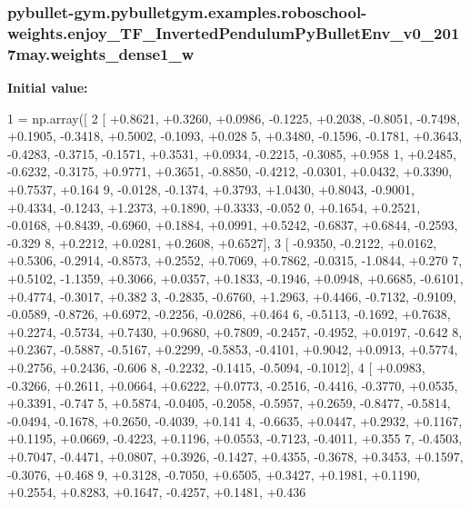 \subsubsection[{\texorpdfstring{weights\+\_\+dense1\+\_\+w}{weights_dense1_w}}]{\setlength{\rightskip}{0pt plus 5cm}pybullet-\/gym.\+pybulletgym.\+examples.\+roboschool-\/weights.\+enjoy\+\_\+\+T\+F\+\_\+\+Inverted\+Pendulum\+Py\+Bullet\+Env\+\_\+v0\+\_\+2017may.\+weights\+\_\+dense1\+\_\+w}\hypertarget{namespacepybullet-gym_1_1pybulletgym_1_1examples_1_1roboschool-weights_1_1enjoy___t_f___inverted9d6b81a55deda3e52174841fe13ce955_af5fe2825bbb15aa261f5709ceb83f697}{}\label{namespacepybullet-gym_1_1pybulletgym_1_1examples_1_1roboschool-weights_1_1enjoy___t_f___inverted9d6b81a55deda3e52174841fe13ce955_af5fe2825bbb15aa261f5709ceb83f697}
{\bfseries Initial value\+:}
\begin{DoxyCode}
1 = np.array([
2 [ +0.8621, +0.3260, +0.0986, -0.1225, +0.2038, -0.8051, -0.7498, +0.1905, -0.3418, +0.5002, -0.1093, +0.028
      5, +0.3480, -0.1596, -0.1781, +0.3643, -0.4283, -0.3715, -0.1571, +0.3531, +0.0934, -0.2215, -0.3085, +0.958
      1, +0.2485, -0.6232, -0.3175, +0.9771, +0.3651, -0.8850, -0.4212, -0.0301, +0.0432, +0.3390, +0.7537, +0.164
      9, -0.0128, -0.1374, +0.3793, +1.0430, +0.8043, -0.9001, +0.4334, -0.1243, +1.2373, +0.1890, +0.3333, -0.052
      0, +0.1654, +0.2521, -0.0168, +0.8439, -0.6960, +0.1884, +0.0991, +0.5242, -0.6837, +0.6844, -0.2593, -0.329
      8, +0.2212, +0.0281, +0.2608, +0.6527],
3 [ -0.9350, -0.2122, +0.0162, +0.5306, -0.2914, -0.8573, +0.2552, +0.7069, +0.7862, -0.0315, -1.0844, +0.270
      7, +0.5102, -1.1359, +0.3066, +0.0357, +0.1833, -0.1946, +0.0948, +0.6685, -0.6101, +0.4774, -0.3017, +0.382
      3, -0.2835, -0.6760, +1.2963, +0.4466, -0.7132, -0.9109, -0.0589, -0.8726, +0.6972, -0.2256, -0.0286, +0.464
      6, -0.5113, -0.1692, +0.7638, +0.2274, -0.5734, +0.7430, +0.9680, +0.7809, -0.2457, -0.4952, +0.0197, -0.642
      8, +0.2367, -0.5887, -0.5167, +0.2299, -0.5853, -0.4101, +0.9042, +0.0913, +0.5774, +0.2756, +0.2436, -0.606
      8, -0.2232, -0.1415, -0.5094, -0.1012],
4 [ +0.0983, -0.3266, +0.2611, +0.0664, +0.6222, +0.0773, -0.2516, -0.4416, -0.3770, +0.0535, +0.3391, -0.747
      5, +0.5874, -0.0405, -0.2058, -0.5957, +0.2659, -0.8477, -0.5814, -0.0494, -0.1678, +0.2650, -0.4039, +0.141
      4, -0.6635, +0.0447, +0.2932, +0.1167, +0.1195, +0.0669, -0.4223, +0.1196, +0.0553, -0.7123, -0.4011, +0.355
      7, -0.4503, +0.7047, -0.4471, +0.0807, +0.3926, -0.1427, +0.4355, -0.3678, +0.3453, +0.1597, -0.3076, +0.468
      9, +0.3128, -0.7050, +0.6505, +0.3427, +0.1981, +0.1190, +0.2554, +0.8283, +0.1647, -0.4257, +0.1481, +0.436

\end{DoxyCode}
